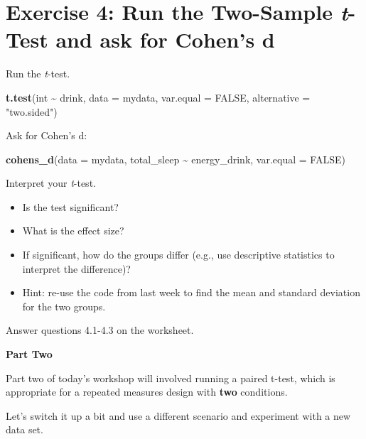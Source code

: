 \documentclass[
]{book}
\newenvironment{Shaded}{\begin{snugshade}}{\end{snugshade}}
\newcommand{\AttributeTok}[1]{\textcolor[rgb]{0.13,0.29,0.53}{#1}}
\newcommand{\ConstantTok}[1]{\textcolor[rgb]{0.56,0.35,0.01}{#1}}
\newcommand{\FunctionTok}[1]{\textcolor[rgb]{0.13,0.29,0.53}{\textbf{#1}}}
\newcommand{\NormalTok}[1]{#1}
\newcommand{\SpecialCharTok}[1]{\textcolor[rgb]{0.81,0.36,0.00}{\textbf{#1}}}
\newcommand{\StringTok}[1]{\textcolor[rgb]{0.31,0.60,0.02}{#1}}
\let\oldsection\section
\renewcommand{\section}{\needspace{5\baselineskip}\oldsection}
\begin{document}
\section{\texorpdfstring{Exercise 4: Run the Two-Sample \emph{t}-Test and ask for Cohen's d}{Exercise 4: Run the Two-Sample t-Test and ask for Cohen's d}}\label{exercise-4-run-the-two-sample-t-test-and-ask-for-cohens-d}

Run the \emph{t}-test.

\begin{Shaded}
\begin{Highlighting}[]
\FunctionTok{t.test}\NormalTok{(int }\SpecialCharTok{\textasciitilde{}}\NormalTok{ drink, }\AttributeTok{data =}\NormalTok{ mydata, }\AttributeTok{var.equal =} \ConstantTok{FALSE}\NormalTok{, }\AttributeTok{alternative =} \StringTok{"two.sided"}\NormalTok{)}
\end{Highlighting}
\end{Shaded}

Ask for Cohen's d:

\begin{Shaded}
\begin{Highlighting}[]
\FunctionTok{cohens\_d}\NormalTok{(}\AttributeTok{data =}\NormalTok{ mydata, total\_sleep }\SpecialCharTok{\textasciitilde{}}\NormalTok{ energy\_drink, }\AttributeTok{var.equal =} \ConstantTok{FALSE}\NormalTok{)}
\end{Highlighting}
\end{Shaded}

Interpret your \emph{t}-test.

\begin{itemize}
\item
  Is the test significant?
\item
  What is the effect size?
\item
  If significant, how do the groups differ (e.g., use descriptive statistics to interpret the difference)?
\item
  Hint: re-use the code from last week to find the mean and standard deviation for the two groups.
\end{itemize}

Answer questions 4.1-4.3 on the worksheet.

\textbf{Part Two}

Part two of today's workshop will involved running a paired t-test, which is appropriate for a repeated measures design with \textbf{two} conditions.

Let's switch it up a bit and use a different scenario and experiment with a new data set.
\end{document}
